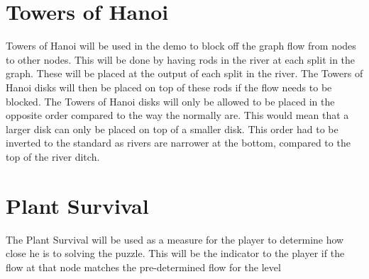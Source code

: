 \section{Towers of Hanoi}
Towers of Hanoi will be used in the demo to block off the graph flow from nodes to other nodes. This will be done by having rods in the river at each split in the graph. These will be placed at the output of each split in the river. The Towers of Hanoi disks will then be placed on top of these rods if the flow needs to be blocked. The Towers of Hanoi disks will only be allowed to be placed in the opposite order compared to the way the normally are. This would mean that a larger disk can only be placed on top of a smaller disk. This order had to be inverted to the standard as rivers are narrower at the bottom, compared to the top of the river ditch. 

\section{Plant Survival}
The Plant Survival will be used as a measure for the player to determine how close he is to solving the puzzle. This will be the indicator to the player if the flow at that node matches the pre-determined flow for the level